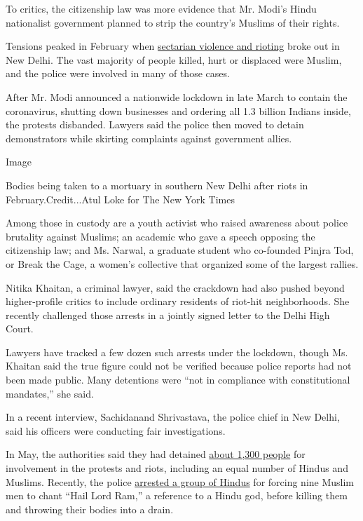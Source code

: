 To critics, the citizenship law was more evidence that Mr. Modi's Hindu
nationalist government planned to strip the country's Muslims of their
rights.

Tensions peaked in February when
\href{https://www.nytimes3xbfgragh.onion/2020/02/25/world/asia/new-delhi-hindu-muslim-violence.html}{sectarian
violence and rioting} broke out in New Delhi. The vast majority of
people killed, hurt or displaced were Muslim, and the police were
involved in many of those cases.

After Mr. Modi announced a nationwide lockdown in late March to contain
the coronavirus, shutting down businesses and ordering all 1.3 billion
Indians inside, the protests disbanded. Lawyers said the police then
moved to detain demonstrators while skirting complaints against
government allies.

Image

Bodies being taken to a mortuary in southern New Delhi after riots in
February.Credit...Atul Loke for The New York Times

Among those in custody are a youth activist who raised awareness about
police brutality against Muslims; an academic who gave a speech opposing
the citizenship law; and Ms. Narwal, a graduate student who co-founded
Pinjra Tod, or Break the Cage, a women's collective that organized some
of the largest rallies.

Nitika Khaitan, a criminal lawyer, said the crackdown had also pushed
beyond higher-profile critics to include ordinary residents of riot-hit
neighborhoods. She recently challenged those arrests in a jointly signed
letter to the Delhi High Court.

Lawyers have tracked a few dozen such arrests under the lockdown, though
Ms. Khaitan said the true figure could not be verified because police
reports had not been made public. Many detentions were ``not in
compliance with constitutional mandates,'' she said.

In a recent interview, Sachidanand Shrivastava, the police chief in New
Delhi, said his officers were conducting fair investigations.

In May, the authorities said they had detained
\href{https://www.thehindu.com/news/cities/Delhi/1300-persons-arrested-for-north-east-delhi-riots-police/article31604364.ece}{about
1,300 people} for involvement in the protests and riots, including an
equal number of Hindus and Muslims. Recently, the police
\href{https://www.thehindu.com/news/cities/Delhi/nine-of-those-killed-in-northeast-delhi-riots-were-forced-to-shout-jai-shri-ram/article31973715.ece}{arrested
a group of Hindus} for forcing nine Muslim men to chant ``Hail Lord
Ram,'' a reference to a Hindu god, before killing them and throwing
their bodies into a drain.

